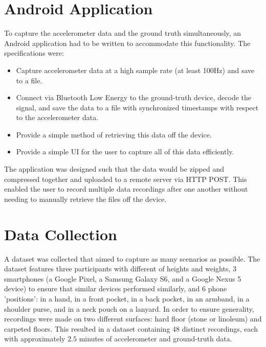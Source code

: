         \section{Android Application}

            To capture the accelerometer data and the ground truth simultaneously, an Android application had to be written to accommodate this functionality. The specifications were:

            \begin{itemize}
                \item Capture accelerometer data at a high sample rate (at least 100Hz) and save to a file.
                \item Connect via Bluetooth Low Energy to the ground-truth device, decode the signal, and save the data to a file with synchronized timestamps with respect to the accelerometer data.
                \item Provide a simple method of retrieving this data off the device.
                \item Provide a simple UI for the user to capture all of this data efficiently.
            \end{itemize}

            The application was designed such that the data would be zipped and compressed together and uploaded to a remote server via HTTP POST. This enabled the user to record multiple data recordings after one another without needing to manually retrieve the files off the device.


        \section{Data Collection}

            A dataset was collected that aimed to capture as many scenarios as possible. The dataset features three participants with different of heights and weights, 3 smartphones (a Google Pixel, a Samsung Galaxy S6, and a Google Nexus 5 device) to ensure that similar devices performed similarly, and 6 phone 'positions': in a hand, in a front pocket, in a back pocket, in an armband, in a shoulder purse, and in a neck pouch on a lanyard. In order to ensure generality, recordings were made on two different surfaces: hard floor (stone or linoleum) and carpeted floors. This resulted in a dataset containing 48 distinct recordings, each with approximately $2.5$ minutes of accelerometer and ground-truth data. 

